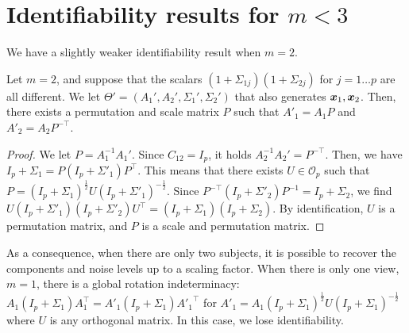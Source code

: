 \section{Identifiability results for $m< 3$}
\label{app:identifiability}
We have a slightly weaker identifiability result when $m=2$.
\begin{prop}
  \label{prop:identifiability_2d}
  Let $m=2$, and suppose that the scalars $(1 + \Sigma_{1j})(1+\Sigma_{2j})$ for $j=1\dots p$ are all different. We let $\Theta'=(A_1', A_2', \Sigma_1',\Sigma_2')$ that also generates $\boldsymbol{x}_1, \boldsymbol{x}_2$. Then, there exists a permutation and scale matrix $P$ such that $A'_1 =A_1P$ and $A'_2 = A_2P^{-\top}$.
\end{prop}
\begin{proof}
  We let $P=A_1^{-1}A_1'$. Since $C_{12} = I_p$, it holds 
  $A_2^{-1}A_2'= P^{-\top}$. Then, we have
  $I_p + \Sigma_1 = P(I_p + \Sigma'_1)P^{\top}$. This means that there exists $U\in\mathcal{O}_p$ such that $P = (I_p + \Sigma_1)^{\frac12}U(I_p + \Sigma'_1)^{-\frac12}$. Since $P^{-\top}(I_p+\Sigma'_2)P^{-1} = I_p+\Sigma_2$, we find
  $U(I_p+\Sigma'_1)(I_p+\Sigma'_2)U^{\top} = (I_p+\Sigma_1)(I_p+\Sigma_2)$. By identification, $U$ is a permutation matrix, and $P$ is a scale and permutation matrix.
\end{proof}
As a consequence, when there are only two subjects, it is possible to recover the components and noise levels up to a scaling factor.
%
When there is only one view, $m=1$, there is a global rotation indeterminacy: 
$
A_1(I_p + \Sigma_1)A_1^{\top} = A'_1(I_p + \Sigma_1){A'_1}^{\top}
$
for $A'_1 = A_1(I_p + \Sigma_1)^{\frac12}U(I_p + \Sigma_1)^{-\frac12}$ where $U$ is any orthogonal matrix. In this case, we lose identifiability.


